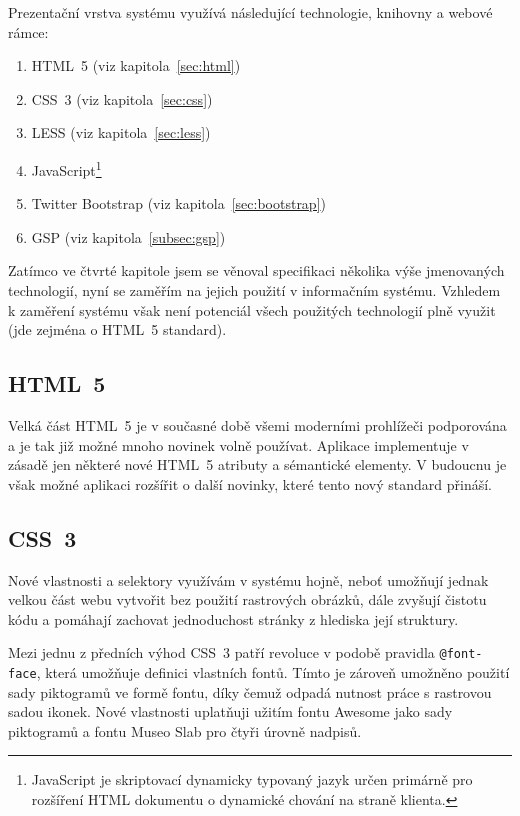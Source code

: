 Prezentační vrstva systému využívá následující technologie, knihovny a webové rámce:

\begin{enumerate}
    \item HTML~5 (viz kapitola~\ref{sec:html})
    \item CSS~3 (viz kapitola~\ref{sec:css})
    \item LESS (viz kapitola~\ref{sec:less})
    \item JavaScript\footnote{JavaScript je skriptovací dynamicky typovaný jazyk určen primárně pro rozšíření HTML dokumentu o dynamické chování na straně klienta.}
    \item Twitter Bootstrap (viz kapitola~\ref{sec:bootstrap})
    \item GSP (viz kapitola~\ref{subsec:gsp})
\end{enumerate}

Zatímco ve čtvrté kapitole jsem se věnoval specifikaci několika výše jmenovaných technologií, nyní se zaměřím na jejich použití v informačním systému. Vzhledem k zaměření systému však není potenciál všech použitých technologií plně využit (jde zejména o HTML~5 standard).

\subsection{HTML~5}

Velká část HTML~5 je v současné době všemi moderními prohlížeči podporována a je tak již možné mnoho novinek volně používat. Aplikace implementuje v zásadě jen některé nové HTML~5 atributy a sémantické elementy. V budoucnu je však možné aplikaci rozšířit o další novinky, které tento nový standard přináší.

\subsection{CSS~3}

Nové vlastnosti a selektory využívám v systému hojně, neboť umožňují jednak velkou část webu vytvořit bez použití rastrových obrázků, dále zvyšují čistotu kódu a pomáhají zachovat jednoduchost stránky z hlediska její struktury.

Mezi jednu z předních výhod CSS~3 patří revoluce v podobě pravidla \texttt{@font-face}, která umožňuje definici vlastních fontů. Tímto je zároveň umožněno použití sady piktogramů ve formě fontu, díky čemuž odpadá nutnost práce s rastrovou sadou ikonek. Nové vlastnosti uplatňuji užitím fontu Awesome jako sady piktogramů a fontu Museo Slab pro čtyři úrovně nadpisů.

